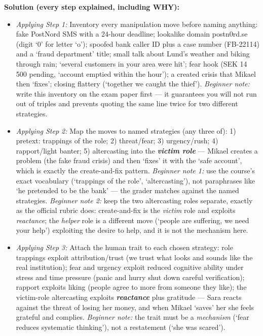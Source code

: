 \documentclass[12pt, a4paper]{article}
\newcommand{\term}[1]{\textbf{\textit{#1}}}        %
\begin{document}
\textbf{Solution (every step explained, including WHY):}
\begin{itemize}
    \item \textit{Applying Step 1:} Inventory every manipulation move before naming anything: fake PostNord SMS with a 24-hour deadline; lookalike domain postn0rd.se (digit `0' for letter `o'); spoofed bank caller ID plus a case number (FB-22114) and a `fraud department' title; small talk about Lund's weather and biking through rain; `several customers in your area were hit'; fear hook (SEK 14 500 pending, `account emptied within the hour'); a created crisis that Mikael then `fixes'; closing flattery (`together we caught the thief'). \emph{Beginner note:} write this inventory on the exam paper first --- it guarantees you will not run out of triples and prevents quoting the same line twice for two different strategies.
    \item \textit{Applying Step 2:} Map the moves to named strategies (any three of): 1) pretext: trappings of the role; 2) threat/fear; 3) urgency/rush; 4) rapport/light banter; 5) altercasting into the \term{victim role} --- Mikael creates a problem (the fake fraud crisis) and then `fixes' it with the `safe account', which is exactly the create-and-fix pattern. \emph{Beginner note 1:} use the course's exact vocabulary (`trappings of the role', `altercasting'), not paraphrases like `he pretended to be the bank' --- the grader matches against the named strategies. \emph{Beginner note 2:} keep the two altercasting roles separate, exactly as the official rubric does: create-and-fix is the \emph{victim} role and exploits \emph{reactance}; the \emph{helper} role is a different move (`people are suffering, we need your help') exploiting the desire to help, and it is not the mechanism here.
    \item \textit{Applying Step 3:} Attach the human trait to each chosen strategy: role trappings exploit attribution/trust (we trust what looks and sounds like the real institution); fear and urgency exploit reduced cognitive ability under stress and time pressure (panic and hurry shut down careful verification); rapport exploits liking (people agree to more from someone they like); the victim-role altercasting exploits \term{reactance} plus gratitude --- Sara reacts against the threat of losing her money, and when Mikael `saves' her she feels grateful and complies. \emph{Beginner note:} the trait must be a \emph{mechanism} (`fear reduces systematic thinking'), not a restatement (`she was scared').

\end{itemize}
\end{document}
